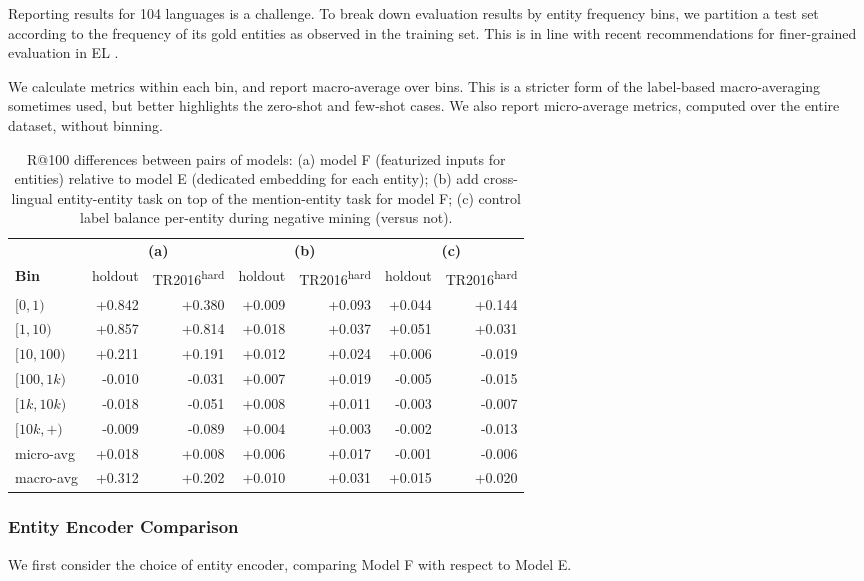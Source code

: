 \documentclass[11pt,a4paper]{article}
\newcommand*{\TR}{TR2016\textsuperscript{hard}}
\begin{document}
Reporting results for 104 languages is a challenge. 
To break down evaluation results by entity
frequency bins, we partition a test set according to the frequency of its gold entities as observed in the training set.
This is in line with recent recommendations for finer-grained evaluation in EL \citep{waitelonis-gerbil2016,ilievski-etal-2018-systematic}.

We calculate 
metrics within each bin, and report macro-average over bins. 
This is a stricter form of the label-based macro-averaging sometimes used,
but better highlights the zero-shot and few-shot
cases. We also report micro-average metrics, computed over the entire dataset, without binning.

\begin{table*}
\centering
\begin{tabular}{l rr rr rr} \toprule
 & \multicolumn{2}{c}{\bf (a)}  & \multicolumn{2}{c}{\bf (b)}  & \multicolumn{2}{c}{\bf (c)}   \\
 \cmidrule(lr){2-3}
 \cmidrule(lr){4-5}
 \cmidrule(lr){6-7}
\textbf{Bin} & holdout & \TR{} & holdout & \TR{} & holdout & \TR{} \\ 
\midrule
$[0, 1)$ & +0.842 & +0.380 & +0.009 & +0.093 & +0.044 & +0.144 \\
$[1, 10)$ & +0.857 & +0.814 & +0.018 & +0.037 & +0.051 & +0.031 \\
$[10, 100)$ & +0.211 & +0.191 & +0.012 & +0.024 & +0.006 & -0.019 \\
$[100, 1k)$ & -0.010 & -0.031 & +0.007 & +0.019 & -0.005 & -0.015 \\
$[1k, 10k)$ & -0.018 & -0.051 & +0.008 & +0.011 & -0.003 & -0.007 \\
$[10k, +)$ & -0.009 & -0.089 & +0.004 & +0.003 & -0.002 & -0.013 \\ \midrule
micro-avg & +0.018 & +0.008 & +0.006 & +0.017 & -0.001 & -0.006 \\
macro-avg & +0.312 & +0.202 & +0.010 & +0.031 & +0.015 & +0.020 \\ \bottomrule
\end{tabular}
\caption{R@100 differences between pairs of models:
(a) model F (featurized inputs for entities) relative to model E (dedicated embedding for each entity);
(b) add cross-lingual entity-entity task on top of the mention-entity task for model F;
(c) control label balance per-entity during negative mining (versus not).
\label{tab:three_pairwise}}
\end{table*}


\subsubsection{Entity Encoder Comparison}
We first consider the choice of entity encoder, comparing Model F with respect to Model E.
\end{document}
